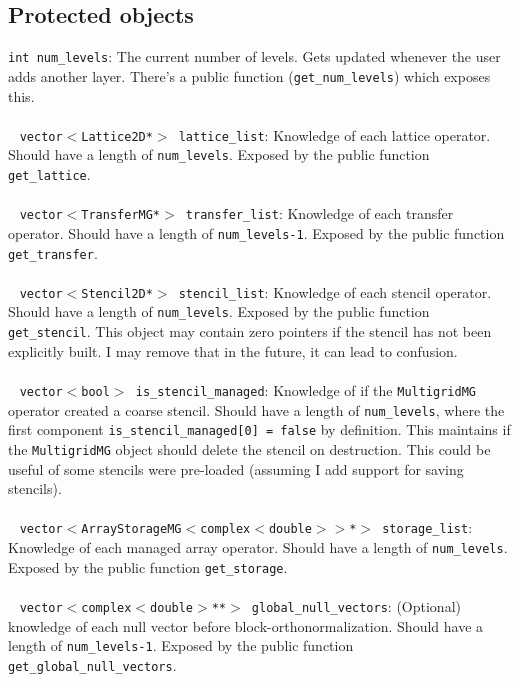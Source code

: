 \documentclass[pdftex,letterpaper,10pt]{article}
\begin{document}
\subsection{Protected objects}

{\texttt{int num\_levels}}: The current number of levels. Gets updated whenever the user adds another layer. There's a public function (\texttt{get\_num\_levels}) which exposes this.
~\\~\\~
{\texttt{vector$<$Lattice2D*$>$ lattice\_list}}: Knowledge of each lattice operator. Should have a length of {\texttt{num\_levels}}. Exposed by the public function {\texttt{get\_lattice}}.
~\\~\\~
{\texttt{vector$<$TransferMG*$>$ transfer\_list}}: Knowledge of each transfer operator. Should have a length of {\texttt{num\_levels-1}}. Exposed by the public function {\texttt{get\_transfer}}.
~\\~\\~
{\texttt{vector$<$Stencil2D*$>$ stencil\_list}}: Knowledge of each stencil operator. Should have a length of {\texttt{num\_levels}}. Exposed by the public function {\texttt{get\_stencil}}. This object may contain zero pointers if the stencil has not been explicitly built. I may remove that in the future, it can lead to confusion.
~\\~\\~
{\texttt{vector$<$bool$>$ is\_stencil\_managed}}: Knowledge of if the {\texttt{MultigridMG}} operator created a coarse stencil. Should have a length of {\texttt{num\_levels}}, where the first component \texttt{is\_stencil\_managed[0] = false} by definition. This maintains if the {\texttt{MultigridMG}} object should delete the stencil on destruction. This could be useful of some stencils were pre-loaded (assuming I add support for saving stencils). 
~\\~\\~
{\texttt{vector$<$ArrayStorageMG$<$complex$<$double$>>$*$>$ storage\_list}}: Knowledge of each managed array operator. Should have a length of {\texttt{num\_levels}}. Exposed by the public function {\texttt{get\_storage}}.
~\\~\\~
{\texttt{vector$<$complex$<$double$>$**$>$ global\_null\_vectors}}: (Optional) knowledge of each null vector before block-orthonormalization. Should have a length of {\texttt{num\_levels-1}}. Exposed by the public function\\{\texttt{get\_global\_null\_vectors}}.
\end{document}

